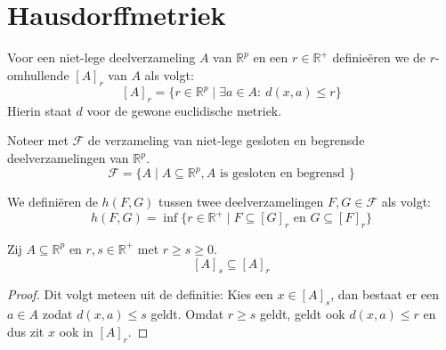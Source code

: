 \documentclass[main.tex]{subfiles}
\begin{document}
\section{Hausdorffmetriek}
\label{sec:hausdorffmetriek}

\begin{de}
  Voor een niet-lege deelverzameling $A$ van $\mathbb{R}^{p}$ en een $r\in \mathbb{R}^{+}$ definie\"eren we de $r$-omhullende $[A]_{r}$ van $A$ als volgt:
  \[ [A]_{r} = \{r \in \mathbb{R}^{p} \mid \exists a \in A:\ d(x,a) \le r \} \]
  Hierin staat $d$ voor de gewone euclidische metriek.
\end{de}

\begin{de}
  Noteer met $\mathcal{F}$ de verzameling van niet-lege gesloten en begrensde deelverzamelingen van $\mathbb{R}^{p}$.
  \[ \mathcal{F} = \{ A \mid A \subseteq \mathbb{R}^{p}, A \text{ is gesloten en begrensd } \} \]
\end{de}

\begin{de}
  We defini\"eren de  $h(F,G)$ tussen twee deelverzamelingen $F,G \in \mathcal{F}$ als volgt:
  \[ h(F,G) = \inf\{ r\in \mathbb{R}^{+} \mid F \subseteq [G]_{r} \text{ en } G \subseteq [F]_{r} \} \]
\end{de}

\begin{blem}
  \label{lem:omhullenden-in-elkaar}
  Zij $A \subseteq \mathbb{R}^{p}$ en $r,s\in\mathbb{R}^{+}$ met $r\ge s \ge 0$.
  \[ [A]_{s} \subseteq [A]_{r} \]

  \begin{proof}
    Dit volgt meteen uit de definitie:
    Kies een $x\in [A]_{s}$, dan bestaat er een $a\in A$ zodat $d(x,a) \le s$ geldt.
    Omdat $r \ge s$ geldt, geldt ook $d(x,a) \le r$ en dus zit $x$ ook in $[A]_{r}$.
  \end{proof}
\end{blem}
\end{document}
